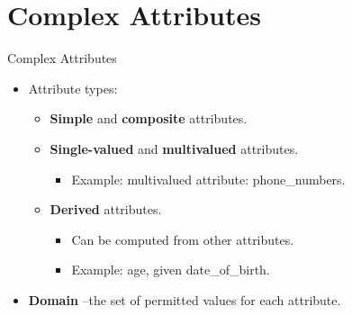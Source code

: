 \documentclass{beamer}
\begin{document}
\section{Complex Attributes}

\begin{frame}{Complex Attributes}
    \begin{itemize}
        \item Attribute types:
        \begin{itemize}
            \item \textbf{Simple} and \textbf{composite} attributes.
            \item \textbf{Single-valued} and \textbf{multivalued} attributes.
            \begin{itemize}
                \item Example: multivalued attribute: phone\_numbers.
            \end{itemize}
            \item \textbf{Derived} attributes.
            \begin{itemize}
                \item Can be computed from other attributes.
                \item Example: age, given date\_of\_birth.
            \end{itemize}
        \end{itemize}
        \item \textbf{Domain} --the set of permitted values for each attribute.
    \end{itemize}
\end{frame}
\end{document}
